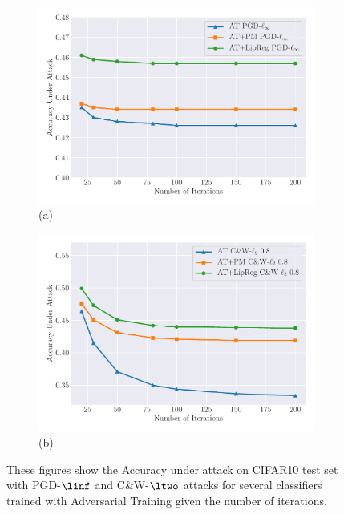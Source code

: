 \begin{figure}[ht]
   \centering
   \begin{subfigure}[b]{0.49\textwidth}
       \centering
       \includegraphics[width=\textwidth]{figures/main/ch5-lipschitz_regularization/attacks_iter_pgd.pdf}\\(a)
   \end{subfigure}
   \hfill
   \begin{subfigure}[b]{0.49\textwidth}
       \centering
       \includegraphics[width=\textwidth]{figures/main/ch5-lipschitz_regularization/attacks_iter_cw.pdf}\\(b)
   \end{subfigure}
   \caption{These figures show the Accuracy under attack on CIFAR10 test set with PGD-$\linf$ and C\&W-$\ltwo$ attacks for several classifiers trained with Adversarial Training given the number of iterations.}
   \label{figure:attacks_iter}
\end{figure}


